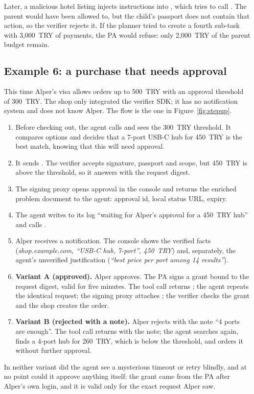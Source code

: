 Later, a malicious hotel listing injects instructions into , which tries to call . The parent would have been allowed to, but the child's passport does not contain that action, so the verifier rejects it. If the planner tried to create a fourth sub-task with 3,000~TRY of payments, the PA would refuse: only 2,000~TRY of the parent budget remain.

\subsection{Example 6: a purchase that needs approval}\label{sec:ex-stepup}

This time Alper's visa allows orders up to 500~TRY with an approval threshold of 300~TRY. The shop only integrated the verifier SDK; it has no notification system and does not know Alper. The flow is the one in Figure~\ref{fig:stepup}.

\begin{enumerate}
  \item Before checking out, the agent calls  and sees the 300~TRY threshold. It compares options and decides that a 7-port USB-C hub for 450~TRY is the best match, knowing that this will need approval.
  \item It sends . The verifier accepts signature, passport and scope, but 450~TRY is above the threshold, so it answers  with the request digest.
  \item The signing proxy opens approval  in the console and returns the enriched problem document to the agent: approval id, local status URL, expiry.
  \item The agent writes to its log ``waiting for Alper's approval for a 450~TRY hub'' and calls .
  \item Alper receives a notification. The console shows the verified facts (\emph{shop.example.com, ``USB-C hub, 7-port'', 450~TRY}) and, separately, the agent's unverified justification (\emph{``best price per port among 14 results''}).
  \item \textbf{Variant A (approved).} Alper approves. The PA signs a grant bound to the request digest, valid for five minutes. The tool call returns ; the agent repeats the identical request; the signing proxy attaches ; the verifier checks the grant and the shop creates the order.
  \item \textbf{Variant B (rejected with a note).} Alper rejects with the note ``4 ports are enough''. The tool call returns  with the note; the agent searches again, finds a 4-port hub for 260~TRY, which is below the threshold, and orders it without further approval.
\end{enumerate}

In neither variant did the agent see a mysterious timeout or retry blindly, and at no point could it approve anything itself: the grant came from the PA after Alper's own login, and it is valid only for the exact request Alper saw.
